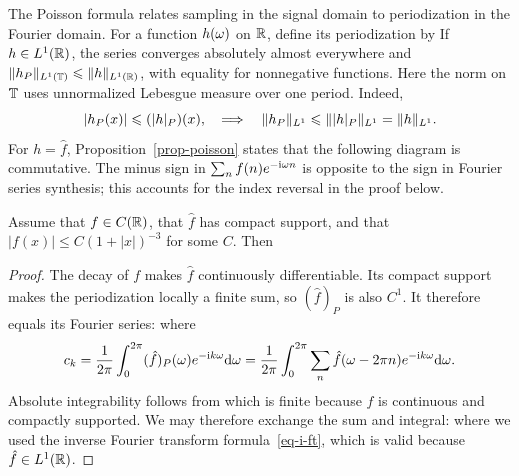 The Poisson formula relates sampling in the signal domain to periodization in the Fourier domain.
%
For a function $h(\omega)$ on $\mathbb{R}$, define its periodization by
If $h \in L^1(\mathbb{R})$, the series converges absolutely almost everywhere and $\lVert h_P\rVert_{L^1(\mathbb{T})} \leqslant \lVert h\rVert_{L^1(\mathbb{R})}$, with equality for nonnegative functions. Here the norm on $\mathbb{T}$ uses unnormalized Lebesgue measure over one period. Indeed,
$$
	|h_P(x)| \leqslant (|h|_P)(x), \quad\Longrightarrow\quad
	\lVert h_P\rVert_{L^1} \leqslant  \lVert|h|_P\rVert_{L^1} = \lVert h\rVert_{L^1}. 
$$
%
For $h=\hat f$, Proposition~\ref{prop-poisson} states that the following diagram
is commutative. The minus sign in $\sum_n f(n)e^{-\mathrm{i}\omega n}$ is opposite to the sign in Fourier series synthesis; this accounts for the index reversal in the proof below.

\begin{prop}\label{prop-poisson}
Assume that $f\in C(\mathbb{R})$, that $\hat f$ has compact support, and that $|f(x)| \leq C(1+|x|)^{-3}$ for some $C$. Then
\end{prop}
\begin{proof}
	The decay of $f$ makes $\hat f$ continuously differentiable. Its compact support makes the periodization locally a finite sum, so $(\hat f)_P$ is also $C^1$. It therefore equals its Fourier series:
	where
	\begin{align*}
		c_k = \frac{1}{2\pi} \int_0^{2\pi} (\hat f)_P(\omega) e^{-\mathrm{i} k \omega} \mathrm{d} \omega = 
		\frac{1}{2\pi} \int_0^{2\pi} \sum_n \hat f(\omega-2\pi n) e^{-\mathrm{i} k \omega}  \mathrm{d} \omega .
	\end{align*}
	Absolute integrability follows from
	which is finite because $\hat f$ is continuous and compactly supported. We may therefore exchange the sum and integral:
	where we used the inverse Fourier transform formula~\eqref{eq-i-ft}, which is valid because $\hat f \in L^1(\mathbb{R})$.
\end{proof}


